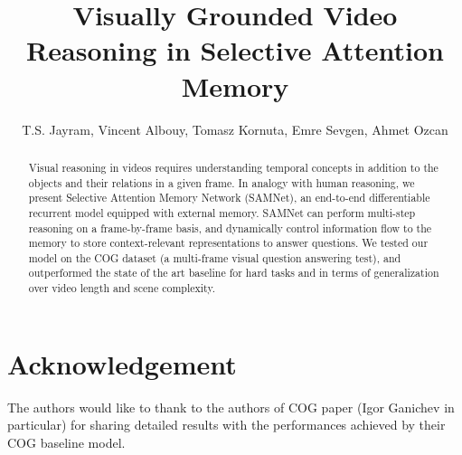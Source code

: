 \documentclass{article}
\title{Visually Grounded Video Reasoning in Selective Attention Memory}
\author{T.S. Jayram, Vincent Albouy, Tomasz Kornuta, Emre Sevgen, Ahmet Ozcan}
\theoremstyle{remark}
\theoremstyle{definition}
\begin{document}
\maketitle
\begin{abstract}
Visual reasoning in videos requires understanding temporal concepts in addition to the objects and their relations in a given frame.  
In analogy with human reasoning, we present Selective Attention Memory Network (SAMNet), an end-to-end differentiable recurrent 
model equipped with external memory.  
SAMNet can perform multi-step reasoning on a frame-by-frame basis, and dynamically control information flow to the memory 
to store context-relevant representations to answer questions. 
We tested our model on the COG dataset (a multi-frame visual question answering test), and outperformed the state of 
the art baseline for hard tasks and in terms of generalization over video length and scene complexity.
\end{abstract}






\newpage



%

\section*{Acknowledgement}
The authors would like to thank to the authors of COG paper (Igor Ganichev in particular) for sharing detailed results with the performances achieved by their COG baseline model.
	
\end{document}
